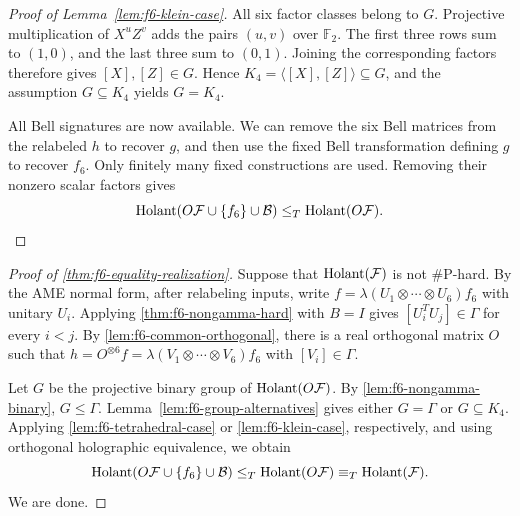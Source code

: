 \begin{proof}[Proof of Lemma~\ref{lem:f6-klein-case}]
All six factor classes belong to $G$.
Projective multiplication of $X^uZ^v$ adds the pairs $(u,v)$
over $\mathbb F_2$.
The first three rows sum to $(1,0)$, and the last three sum to
$(0,1)$. Joining the corresponding factors therefore gives
$[X],[Z]\in G$.
Hence $K_4=\langle[X],[Z]\rangle\subseteq G$, and the assumption
$G\subseteq K_4$ yields $G=K_4$.

All Bell signatures are now available.
We can remove the six Bell matrices from the relabeled $h$ to
recover $g$, and then use the fixed Bell transformation defining
$g$ to recover $f_6$.
Only finitely many fixed constructions are used.
Removing their nonzero scalar factors gives
\[
\operatorname{Holant}(O\mathcal F\cup\{f_6\}\cup\mathcal B)
\leq_T\operatorname{Holant}(O\mathcal F).
\]
\end{proof}


\begin{proof}[Proof of \cref{thm:f6-equality-realization}]
Suppose that $\operatorname{Holant}(\mathcal F)$
is not $\#\mathrm P$-hard.
By the AME normal form, after relabeling inputs, write
$f=\lambda(U_1\otimes\cdots\otimes U_6)f_6$ with unitary $U_i$.
Applying \cref{thm:f6-nongamma-hard} with $B=I$ gives
$[U_i^TU_j]\in\Gamma$ for every $i<j$.
By \cref{lem:f6-common-orthogonal}, there is a real orthogonal
matrix $O$ such that
$h=O^{\otimes6}f=\lambda(V_1\otimes\cdots\otimes V_6)f_6$
with $[V_i]\in\Gamma$.

Let $G$ be the projective binary group of $\operatorname{Holant}(O\mathcal F)$.
By \cref{lem:f6-nongamma-binary}, $G\leq\Gamma$.
Lemma~\ref{lem:f6-group-alternatives} gives either $G=\Gamma$
or $G\subseteq K_4$.
Applying \cref{lem:f6-tetrahedral-case} or
\cref{lem:f6-klein-case}, respectively, and using orthogonal
holographic equivalence, we obtain
\[
\operatorname{Holant}(O\mathcal F\cup\{f_6\}\cup\mathcal B)
\leq_T\operatorname{Holant}(O\mathcal F)
\equiv_T\operatorname{Holant}(\mathcal F).
\]
We are done.
\end{proof}
